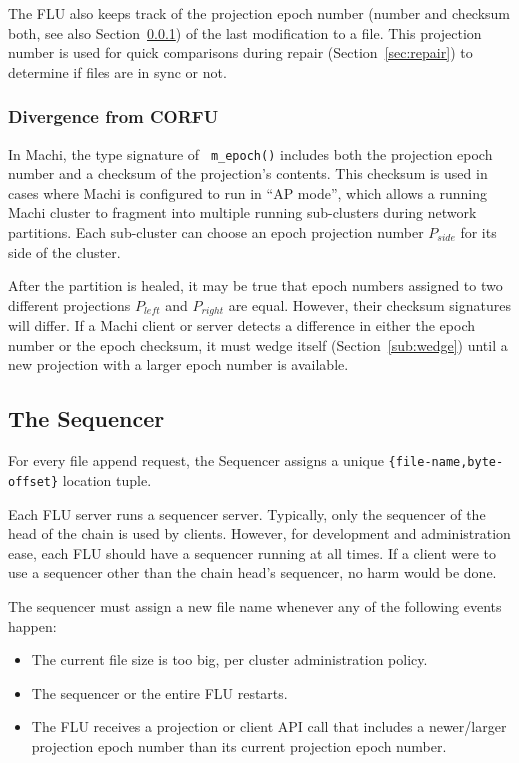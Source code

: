 \documentclass[preprint,10pt]{sigplanconf}
\begin{document}
The FLU also keeps track of the projection epoch number (number and checksum
both, see also Section~\ref{sub:flu-divergence}) of the last modification to a
file.  This projection number is used for quick comparisons during
repair (Section~\ref{sec:repair}) to determine if files are in sync or
not.

\subsubsection{Divergence from CORFU}
\label{sub:flu-divergence}

In Machi, the type signature of {\tt
  m\_epoch()} includes both the projection epoch number and a checksum
of the projection's contents.  This checksum is used in cases where
Machi is configured to run in ``AP mode'', which allows a running Machi
cluster to fragment into multiple running sub-clusters during network
partitions.  Each sub-cluster can choose an epoch projection number
$P_{side}$ for its side of the cluster.

After the partition is
healed, it may be true that epoch numbers assigned to two different
projections $P_{left}$ and  $P_{right}$
are equal.  However, their checksum signatures will differ.  If a
Machi client or server detects a difference in either the epoch number
or the epoch checksum, it must wedge itself (Section~\ref{sub:wedge})
until a new projection with a larger epoch number is available.

\subsection{The Sequencer}
\label{sub:sequencer}

For every file append request, the Sequencer assigns a unique
{\tt \{file-name,byte-offset\}} location tuple.

Each FLU server runs a sequencer server.  Typically, only the
sequencer of the head of the chain is used by clients.  However, for
development and administration ease, each FLU should have a sequencer
running at all times.  If a client were to use a sequencer other than
the chain head's sequencer, no harm would be done.

The sequencer must assign a new file name whenever any of the
following events happen:
\begin{itemize}
\item The current file size is too big, per cluster administration policy.
\item The sequencer or the entire FLU restarts.
\item The FLU receives a projection or client API call
  that includes a newer/larger projection epoch
  number than its current projection epoch number.
\end{itemize}
\end{document}
